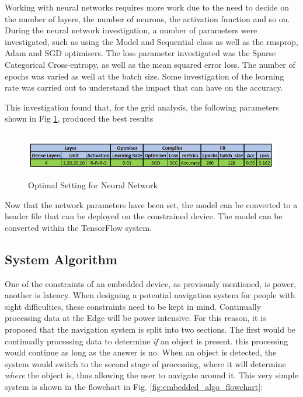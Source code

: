 \documentclass{svproc}
\begin{document}
Working with neural networks requires more work due to the need to decide on the number of layers, the number of neurons, the activation 
function and so on. During the neural network investigation, a number of parameters were investigated, such as using the Model and Sequential 
class as well as the rmsprop, Adam and SGD optimisers. The loss parameter investigated was the Sparse Categorical Cross-entropy, as well as 
the mean squared error loss. The number of epochs was varied as well at the batch size. Some investigation of the learning rate was carried 
out to understand the impact that can have on the accuracy. 

This investigation found that, for the grid analysis, the following parameters shown in Fig \ref{fig:nn_settings}, produced the best results

\begin{figure}[ht]
\includegraphics[width=12cm, height=2cm]{images/nn_settings.png}
\centering
\caption{Optimal Setting for Neural Network}
\label{fig:nn_settings}
\end{figure}

Now that the network parameters have been set, the model can be converted to a header file that can be deployed on the constrained device. 
The model can be converted within the TensorFlow system.

\subsection{System Algorithm}
One of the constraints of an embedded device, as previously mentioned, is power, another is latency. When designing a potential navigation 
system for people with sight difficulties, these constraints need to be kept in mind. Continually processing data at the Edge will be power intensive. 
For this reason, it is proposed that the navigation system is split into two sections. The first would be continually processing data to 
determine \textit{if} an object is present. this processing would continue as long as the answer is no. When an object is detected, the system would 
switch to the second stage of processing, where it will determine \textit{where} the object is, thus allowing the user to navigate around it. This very 
simple system is shown in the flowchart in Fig. \ref{fig:embedded_algo_flowchart}:
\end{document}
